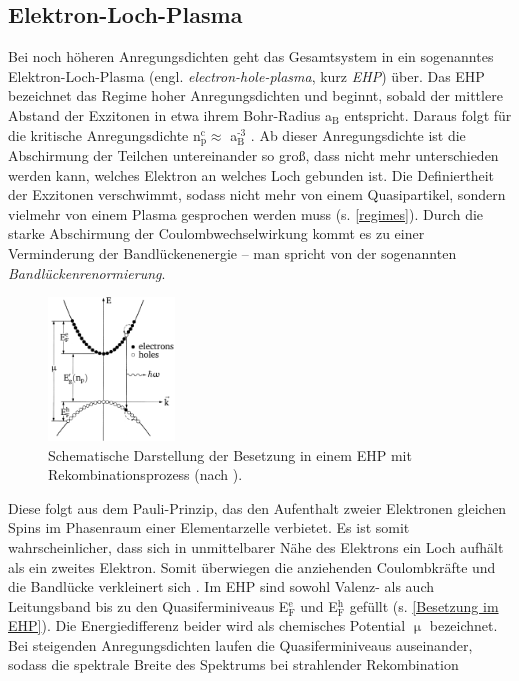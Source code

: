 \subsection{Elektron-Loch-Plasma}
\label{EHP}
Bei noch höheren Anregungsdichten geht das Gesamtsystem in ein sogenanntes Elektron-Loch-Plasma (engl. \textit{electron-hole-plasma}, kurz \textit{EHP}) über. Das EHP bezeichnet das Regime hoher Anregungsdichten und beginnt, sobald der mittlere Abstand der Exzitonen in etwa ihrem Bohr-Radius a$_\text{B}$ entspricht. Daraus folgt für die kritische Anregungsdichte n$_\text{p}^\text{c}\approx$ a$_\text{B}^\text{-3}$ \cite{Klingshirn.2007}. Ab dieser Anregungsdichte ist die Abschirmung der Teilchen untereinander so groß, dass nicht mehr unterschieden werden kann, welches Elektron an welches Loch gebunden ist. Die Definiertheit der Exzitonen verschwimmt, sodass nicht mehr von einem Quasipartikel, sondern vielmehr von einem Plasma gesprochen werden muss (s. \autoref{regimes}). Durch die starke Abschirmung der Coulombwechselwirkung kommt es zu einer Verminderung der Bandlückenenergie – man spricht von der sogenannten \textit{Bandlückenrenormierung}.\begin{figure}[b]
\centering
\includegraphics[width=0.3\textwidth]{Bilder/Vorbetrachtung/ehp}
\caption[Besetzung im EHP]{Schematische Darstellung der Besetzung in einem EHP mit Rekombinationsprozess (nach \cite{Klingshirn.2007}).}
\label{Besetzung im EHP}
\end{figure} Diese folgt aus dem Pauli-Prinzip, das den Aufenthalt zweier Elektronen gleichen Spins im Phasenraum einer Elementarzelle verbietet. Es ist somit wahrscheinlicher, dass sich in unmittelbarer Nähe des Elektrons ein Loch aufhält als ein zweites Elektron. Somit überwiegen die anziehenden Coulombkräfte und die Bandlücke verkleinert sich \cite{Klingshirn.2007}. Im EHP sind sowohl Valenz- als auch Leitungsband bis zu den Quasiferminiveaus E$_\text{F}^\text{e}$ und E$_\text{F}^\text{h}$ gefüllt (s. \autoref {Besetzung im EHP}). Die Energiedifferenz beider wird als chemisches Potential $\upmu$ bezeichnet. Bei steigenden Anregungsdichten laufen die Quasiferminiveaus auseinander, sodass die spektrale Breite des Spektrums bei strahlender Rekombination
